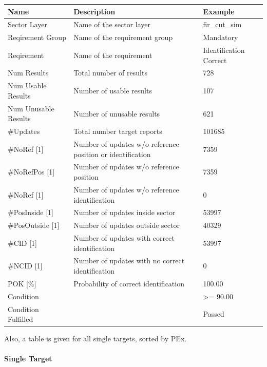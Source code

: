 \begin{center}
 \begin{table}[H]
  \begin{tabularx}{\textwidth}{ | l | X |  l | }
    \hline
    \textbf{Name} & \textbf{Description} & \textbf{Example} \\ \hline
    Sector Layer & Name of the sector layer & fir\_cut\_sim \\ \hline
    Reqirement Group & Name of the requirement group & Mandatory \\ \hline
    Reqirement & Name of the requirement & Identification Correct \\ \hline
    Num Results & Total number of results & 728 \\ \hline
    Num Usable Results & Number of usable results & 107 \\ \hline
    Num Unusable Results & Number of unusable results & 621 \\ \hline
    \#Updates & Total number target reports & 101685 \\ \hline
    \#NoRef [1] & Number of updates w/o reference position or identification & 7359 \\ \hline
    \#NoRefPos [1] & Number of updates w/o reference position  & 7359 \\ \hline
    \#NoRef [1] & Number of updates w/o reference identification & 0 \\ \hline
    \#PosInside [1] & Number of updates inside sector & 53997 \\ \hline
    \#PosOutside [1] & Number of updates outside sector & 40329 \\ \hline
    \#CID [1] & Number of updates with correct identification & 53997 \\ \hline
    \#NCID [1] & Number of updates with no correct identification & 0 \\ \hline
    POK [\%] & Probability of correct identification & 100.00 \\ \hline
    Condition &  & >= 90.00 \\ \hline
    Condition Fulfilled &  & Passed \\ \hline
\end{tabularx}
\end{table}
\end{center}

Also, a table is given for all single targets, sorted by PEx.

\paragraph{Single Target}

